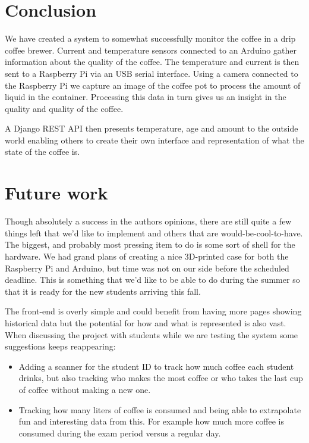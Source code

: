 \documentclass[12pt,a4paper,oneside,article]{memoir}
\numberwithin{equation}{chapter}
\begin{document}
\section{Conclusion}\label{sec:conclusion}
We have created a system to somewhat successfully monitor the coffee in a drip
coffee brewer. Current and temperature sensors connected to an Arduino gather
information about the quality of the coffee. The temperature and current is then
sent to a Raspberry Pi via an USB serial interface. Using a camera connected to
the Raspberry Pi we capture an image of the coffee pot to process the amount of
liquid in the container. Processing this data in turn gives us an insight in the
quality and quality of the coffee.

A Django REST API then presents temperature, age and amount to the outside 
world enabling others to create their own interface and representation of what
the state of the coffee is.

\section{Future work}\label{sec:future-work}
Though absolutely a success in the authors opinions, there are still quite a few
things left that we'd like to implement and others that are
would-be-cool-to-have. The biggest, and probably most pressing item to do is
some sort of shell for the hardware. We had grand plans of creating a nice
3D-printed case for both the Raspberry Pi and Arduino, but time was not on our
side before the scheduled deadline. This is something that we'd like to be able
to do during the summer so that it is ready for the new students arriving this
fall.

The front-end is overly simple and could benefit from having more pages showing
historical data but the potential for how and what is represented is also vast.
When discussing the project with students while we are testing the system some
suggestions keeps reappearing:

\begin{itemize}
\item Adding a scanner for the student ID to track how much coffee each student
  drinks, but also tracking who makes the most coffee or who takes the last cup
  of coffee without making a new one.
\item Tracking how many liters of coffee is consumed and being able to
  extrapolate fun and interesting data from this. For example how much more
  coffee is consumed during the exam period versus a regular day.
\end{itemize}
\end{document}
